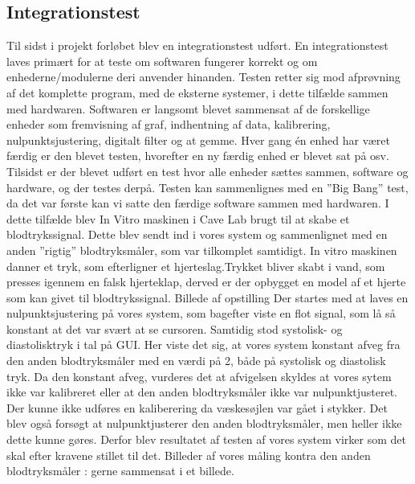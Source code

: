 \subsection{Integrationstest}
Til sidst i projekt forløbet blev en integrationstest udført. En integrationstest laves primært for at teste om softwaren fungerer korrekt og om enhederne/modulerne deri anvender hinanden. Testen retter sig mod afprøvning af det komplette program, med de eksterne systemer, i dette tilfælde sammen med hardwaren. 
Softwaren er langsomt blevet sammensat af de forskellige enheder som fremvisning af graf, indhentning af data, kalibrering, nulpunktsjustering, digitalt filter og at gemme. Hver gang én enhed har været færdig er den blevet testen, hvorefter en ny færdig enhed er blevet sat på osv. Tilsidst er der blevet udført  en test hvor alle enheder sættes sammen, software og hardware,  og der testes derpå. Testen kan sammenlignes med en ”Big Bang” test, da det var første kan vi satte den færdige software sammen med hardwaren.  
I dette tilfælde blev In Vitro maskinen i Cave Lab brugt til at skabe et blodtrykssignal. Dette blev sendt ind i vores system og sammenlignet med en anden ”rigtig” blodtryksmåler, som var tilkomplet samtidigt.  In vitro maskinen danner et tryk, som efterligner et hjerteslag.Trykket bliver skabt i vand, som presses igennem en falsk hjerteklap, derved er der opbygget en model af et hjerte som kan givet til blodtrykssignal. 
Billede af opstilling
Der startes med at laves en nulpunktsjustering på vores system, som bagefter viste en flot signal, som lå så konstant at det var svært at se cursoren. Samtidig stod systolisk- og diastolisktryk i tal på GUI. Her viste det sig, at vores system konstant afveg fra den anden blodtryksmåler med en værdi på 2, både på systolisk og diastolisk tryk. Da den konstant afveg, vurderes det at afvigelsen skyldes at vores sytem ikke var kalibreret eller at den anden blodtryksmåler ikke var nulpunktjusteret.  Der kunne ikke udføres en kaliberering da væskesøjlen var gået i stykker. Det blev også forsøgt at nulpunktjusterer den anden blodtryksmåler, men heller ikke dette kunne gøres.  Derfor blev resultatet af testen af vores system virker som det skal efter kravene stillet til det.  
Billeder af vores måling kontra den anden blodtryksmåler : gerne sammensat i et billede. 

